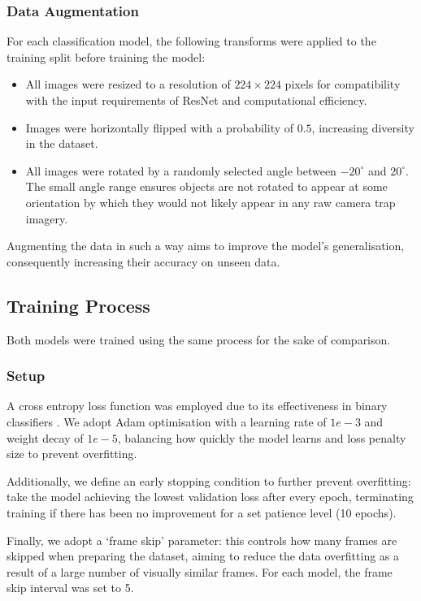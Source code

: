 \documentclass[author={Jacob Stephenson},
    degree={BSc},
    title={Robust Great Ape Species Detection in Wild Camera Trap Imagery with Promptable Concept Segmentation},
    unit={COMS30045},
    subtitle={}]{dissertation}
\begin{document}
\subsubsection{Data Augmentation}

For each classification model, the following transforms were applied to the training split before training the model:
\begin{itemize}
    \item All images were resized to a resolution of $224 \times 224$ pixels for compatibility with the input requirements of ResNet and computational efficiency.
    \item Images were horizontally flipped with a probability of $0.5$, increasing diversity in the dataset.
    \item All images were rotated by a randomly selected angle between $-20^\circ$ and $20^\circ$. The small angle range ensures objects are not rotated to appear at some orientation by which they would not likely appear in any raw camera trap imagery.
\end{itemize}
Augmenting the data in such a way aims to improve the model's generalisation, consequently increasing their accuracy on unseen data.



\subsection{Training Process}
\label{sec:execution_training}

Both models were trained using the same process for the sake of comparison.

\subsubsection{Setup}

A cross entropy loss function was employed due to its effectiveness in binary classifiers \cite{crossentropy}. We adopt Adam optimisation \cite{kingma2017adammethodstochasticoptimization} with a learning rate of $1e-3$ and weight decay of $1e-5$, balancing how quickly the model learns and loss penalty size to prevent overfitting.

Additionally, we define an early stopping condition to further prevent overfitting: take the model achieving the lowest validation loss after every epoch, terminating training if there has been no improvement for a set patience level (10 epochs).

Finally, we adopt a `frame skip' parameter: this controls how many frames are skipped when preparing the dataset, aiming to reduce the data overfitting as a result of a large number of visually similar frames. For each model, the frame skip interval was set to 5.
\end{document}
